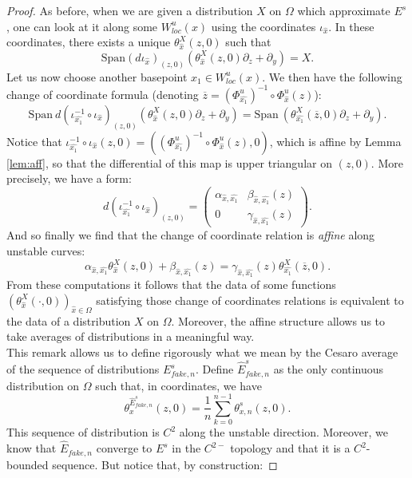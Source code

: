 \documentclass[a4paper]{article}
\theoremstyle{definition}
\begin{document}
\begin{proof}
As before, when we are given a distribution $X$ on $\Omega$ which approximate $E^s$, one can look at it along some $W^u_{loc}(x)$ using the coordinates $\iota_{\widehat{x}}$. In these coordinates, there exists a unique $\theta_{\widehat{x}}^X(z,0)$ such that $$ \text{Span} (d \iota_{\widehat{x}})_{(z,0)}( \theta_{\widehat{x}}^X(z,0) \partial_z + \partial_y ) = X. $$ 
Let us now choose another basepoint $x_1 \in W^u_{loc}(x)$. We then have the following change of coordinate formula (denoting $\overline{z} = (\Phi_{\widehat{x_1}}^u)^{-1} \circ \Phi_{\widehat{x}}^u(z)$):
$$ \text{Span} \ d(\iota_{\widehat{x_1}}^{-1} \circ \iota_{\widehat{x}})_{(z,0)}( \theta_{\widehat{x}}^X(z,0) \partial_z + \partial_y ) = \text{Span} \ (\theta_{\widehat{x_1}}^{X}(\overline{z},0) \partial_z + \partial_y) .$$
Notice that $\iota_{\widehat{x_1}}^{-1} \circ \iota_{\widehat{x}}(z,0) = ( (\Phi_{\widehat{x_1}}^u)^{-1} \circ \Phi_{\widehat{x}}^u(z) , 0 )$, which is affine by Lemma \ref{lem:aff}, so that the differential of this map is upper triangular on $(z,0)$. More precisely, we have a form:
$$ d(\iota_{\widehat{x_1}}^{-1} \circ \iota_{\widehat{x}})_{(z,0)} =   \left( \begin{array}{lrcl}
  \alpha_{{\widehat{x}},\widehat{x_1}} & \beta_{{\widehat{x}},\widehat{x_1}}(z) \\
     0 & \gamma_{\widehat{x},\widehat{x_1}}(z)   \end{array} \right). $$
And so finally we find that the change of coordinate relation is \emph{affine} along unstable curves:
$$ \alpha_{{\widehat{x}},\widehat{x_1}} \theta_{\widehat{x}}^X(z,0) + \beta_{{\widehat{x}},\widehat{x_1}}(z) =  \gamma_{\widehat{x},\widehat{x_1}}(z)    \theta_{\widehat{x_1}}^X(\overline{z},0)  .$$ 
From these computations it follows that the data of some functions $(\theta_{\widehat{x}}^X(\cdot,0))_{{\widehat{x}} \in \Omega}$ satisfying those change of coordinates relations is equivalent to the data of a distribution $X$ on $\Omega$. Moreover, the affine structure allows us to take averages of distributions in a meaningful way.
\\

This remark allows us to define rigorously what we mean by the Cesaro average of the sequence of distributions $E^s_{fake,n}$. Define $\widehat{E}^s_{fake,n}$ as the only continuous distribution on $\Omega$ such that, in coordinates, we have
$$ \theta_x^{\widehat{E}^s_{fake,n}}(z,0) = \frac{1}{n} \sum_{k=0}^{n-1} \theta_{x,n}^{s}(z,0). $$
This sequence of distribution is $C^2$ along the unstable direction. Moreover, we know that $\widehat{E}_{fake,n}$ converge to $E^s$ in the $C^{2-}$ topology and that it is a $C^2$-bounded sequence. But notice that, by construction:


\end{proof}
\end{document}
